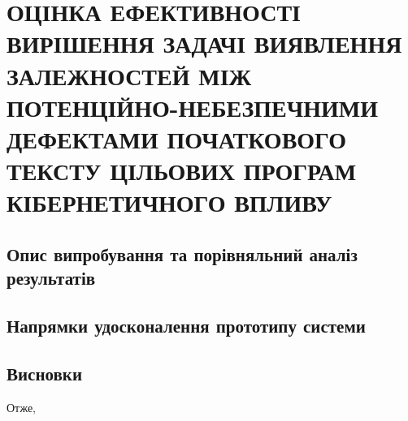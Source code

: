\chapter{ОЦІНКА ЕФЕКТИВНОСТІ ВИРІШЕННЯ ЗАДАЧІ ВИЯВЛЕННЯ ЗАЛЕЖНОСТЕЙ МІЖ ПОТЕНЦІЙНО-НЕБЕЗПЕЧНИМИ ДЕФЕКТАМИ ПОЧАТКОВОГО ТЕКСТУ ЦІЛЬОВИХ ПРОГРАМ КІБЕРНЕТИЧНОГО ВПЛИВУ}
\label{4section::doc}\label{4section:id1}

\section{Опис випробування та порівняльний аналіз результатів}
\label{4section:id2}

\section{Напрямки удосконалення прототипу системи}
\label{4section:id3}

\section*{Висновки}
Отже,
